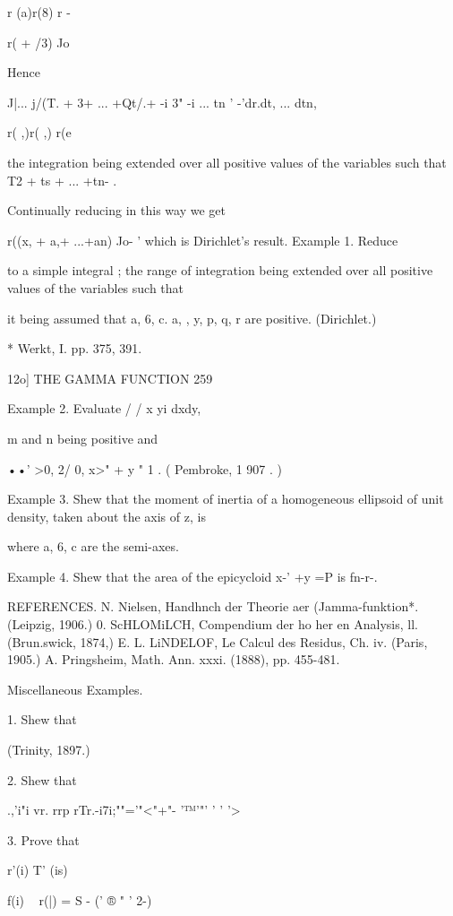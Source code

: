 r (a)r(8) r -



r( + /3) Jo

Hence



  J|... j/(T. + 3+ ... +Qt/.+ -i 3" -i ... tn ' -'dr.dt, ... dtn,



r( ,)r( ,) r(e

the integration being extended over all positive values of the
variables such that T2 + ts + ... +tn- .

Continually reducing in this way we get

r((x, + a,+ ...+an) Jo- ' which is Dirichlet's result. Example 1.
Reduce

to a simple integral ; the range of integration being extended over
all positive values of the variables such that

it being assumed that a, 6, c. a, , y, p, q, r are positive.
(Dirichlet.)

* Werkt, I. pp. 375, 391.



12o] THE GAMMA FUNCTION 259

Example 2. Evaluate / / x yi dxdy,

m and n being positive and

••' >0, 2/ 0, x>" + y " 1 . ( Pembroke, 1 907 . )

Example 3. Shew that the moment of inertia of a homogeneous ellipsoid
of unit density, taken about the axis of z, is

where a, 6, c are the semi-axes.

Example 4. Shew that the area of the epicycloid x-' +y =P is fn-r-.

REFERENCES. N. Nielsen, Handhnch der Theorie aer (Jamma-funktion*.
(Leipzig, 1906.) 0. ScHLOMiLCH, Compendium der ho her en Analysis, ll.
(Brun.swick, 1874,) E. L. LiNDELOF, Le Calcul des Residus, Ch. iv.
(Paris, 1905.) A. Pringsheim, Math. Ann. xxxi. (1888), pp. 455-481.

Miscellaneous Examples.

1. Shew that

(Trinity, 1897.)

2. Shew that

.,'i"i vr. rrp rTr.-i7i;""='"<"+"- '™'"' ' ' '>

3. Prove that

r'(i) T' (is)

f(i) ~ r(|) = S - (' ® " ' 2-)

